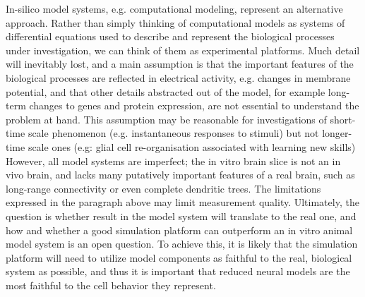 In-silico model systems, e.g. computational modeling, represent an alternative approach.  Rather than simply thinking of computational models as systems of differential equations used to describe and represent the biological processes under investigation, we can think of them as experimental platforms. Much detail will inevitably lost, and a main assumption is that the important features of the biological processes are reflected in electrical activity, e.g. changes in membrane potential, and that other details abstracted out of the model, for example long-term changes to genes and protein expression, are not essential to understand the problem at hand.  This assumption may be reasonable for investigations of short-time scale phenomenon (e.g. instantaneous responses to stimuli) but not longer-time scale ones (e.g: glial cell re-organisation associated with learning new skills) %
However, all model systems are imperfect; the in vitro brain slice is not an in vivo brain, and lacks many putatively important features of a real brain, such as long-range connectivity or even complete dendritic trees.  The limitations expressed in the paragraph above may limit measurement quality.  Ultimately, the question is whether result in the model system will translate to the real one, and how and whether a good simulation platform can outperform an in vitro animal model system is an open question.  To achieve this, it is likely that the simulation platform will need to utilize model components as faithful to the real, biological system as possible, and thus it is important that reduced neural models are the most faithful to the cell behavior they represent. 

\\


